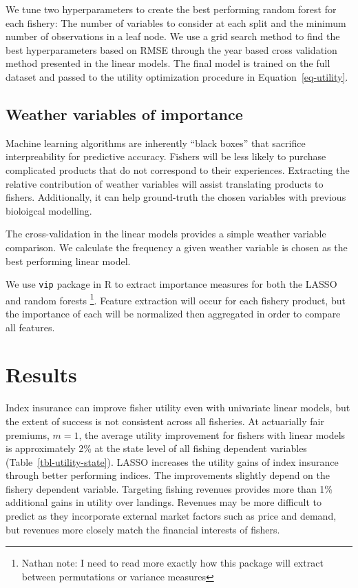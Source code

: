 \documentclass[
  letterpaper,
  DIV=11,
  numbers=noendperiod]{scrartcl}
\begin{document}
We tune two hyperparameters to create the best performing random forest
for each fishery: The number of variables to consider at each split and
the minimum number of observations in a leaf node. We use a grid search
method to find the best hyperparameters based on RMSE through the year
based cross validation method presented in the linear models. The final
model is trained on the full dataset and passed to the utility
optimization procedure in Equation~\ref{eq-utility}.

\hypertarget{weather-variables-of-importance}{%
\subsection{Weather variables of
importance}\label{weather-variables-of-importance}}

Machine learning algorithms are inherently ``black boxes'' that
sacrifice interpreability for predictive accuracy. Fishers will be less
likely to purchase complicated products that do not correspond to their
experiences. Extracting the relative contribution of weather variables
will assist translating products to fishers. Additionally, it can help
ground-truth the chosen variables with previous bioloigcal modelling.

The cross-validation in the linear models provides a simple weather
variable comparison. We calculate the frequency a given weather variable
is chosen as the best performing linear model.

We use \texttt{vip} package in R to extract importance measures for both
the LASSO and random forests \footnote{Nathan note: I need to read more
  exactly how this package will extract between permutations or variance
  measures}. Feature extraction will occur for each fishery product, but
the importance of each will be normalized then aggregated in order to
compare all features.

\hypertarget{sec-results}{%
\section{Results}\label{sec-results}}

Index insurance can improve fisher utility even with univariate linear
models, but the extent of success is not consistent across all
fisheries. At actuarially fair premiums, \(m=1\), the average utility
improvement for fishers with linear models is approximately 2\% at the
state level of all fishing dependent variables
(Table~\ref{tbl-utility-state}). LASSO increases the utility gains of
index insurance through better performing indices. The improvements
slightly depend on the fishery dependent variable. Targeting fishing
revenues provides more than 1\% additional gains in utility over
landings. Revenues may be more difficult to predict as they incorporate
external market factors such as price and demand, but revenues more
closely match the financial interests of fishers.
\end{document}
